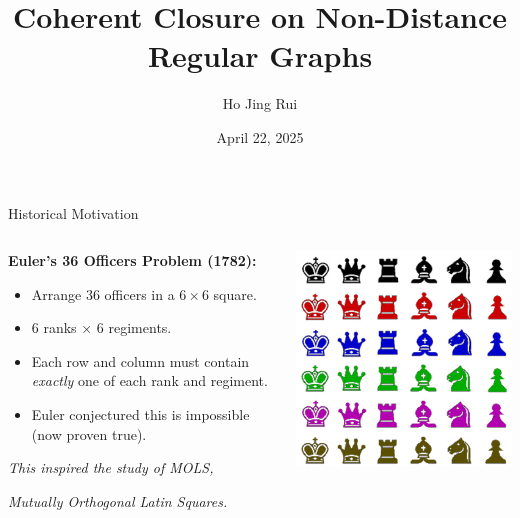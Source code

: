 \documentclass{beamer}
\title[FYP]{Coherent Closure on Non-Distance Regular Graphs}
\author{Ho Jing Rui}
\institute[NTU]{Nanyang Technological University}
\date{April 22, 2025}
\begin{document}
\begin{frame}
  \titlepage
\end{frame}

\begin{frame}{Historical Motivation}
\begin{columns}

  \begin{column}{0.6\textwidth}
    \textbf{Euler's 36 Officers Problem (1782):}
    \begin{itemize}
      \item Arrange 36 officers in a \(6 \times 6\) square.
      \item 6 ranks × 6 regiments.
      \item Each row and column must contain \textit{exactly} one of each rank and regiment.
      \item Euler conjectured this is impossible (now proven true).
    \end{itemize}

    \vspace{1em}
    \textit{This inspired the study of MOLS,}
    
    \textit{Mutually Orthogonal Latin Squares.}
  \end{column}

  \begin{column}{0.4\textwidth}
    \centering
    \includegraphics[width=\textwidth]{slides/bigsix.jpg}
  \end{column}

\end{columns}
\end{frame}
\end{document}
